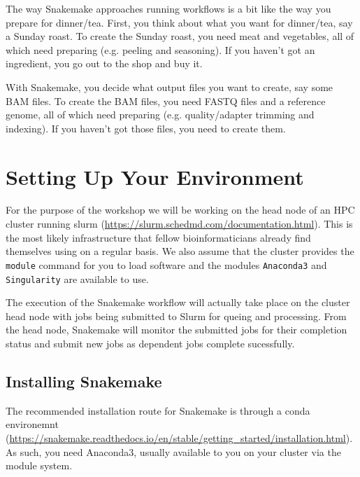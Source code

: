 The way Snakemake approaches running workflows is a bit like the way you prepare for dinner/tea.
First, you think about what you want for dinner/tea, say a Sunday roast.
To create the Sunday roast, you need meat and vegetables, all of which need preparing (e.g. peeling and seasoning).
If you haven't got an ingredient, you go out to the shop and buy it.

With Snakemake, you decide what output files you want to create, say some BAM files.
To create the BAM files, you need FASTQ files and a reference genome, all of which need preparing (e.g. quality/adapter trimming and indexing).
If you haven't got those files, you need to create them.


\section{Setting Up Your Environment}

For the purpose of the workshop we will be working on the head node of an HPC cluster running slurm (\url{https://slurm.schedmd.com/documentation.html}).
This is the most likely infrastructure that fellow bioinformaticians already find themselves using on a regular basis.
We also assume that the cluster provides the \texttt{module} command for you to load software and the modules \texttt{Anaconda3} and \texttt{Singularity} are available to use.

The execution of the Snakemake workflow will actually take place on the cluster head node with jobs being submitted to Slurm for queing and processing.
From the head node, Snakemake will monitor the submitted jobs for their completion status and submit new jobs as dependent jobs complete sucessfully.

\subsection{Installing Snakemake}

The recommended installation route for Snakemake is through a conda environemnt (\url{https://snakemake.readthedocs.io/en/stable/getting_started/installation.html}).
As such, you need Anaconda3, usually available to you on your cluster via the module system.

